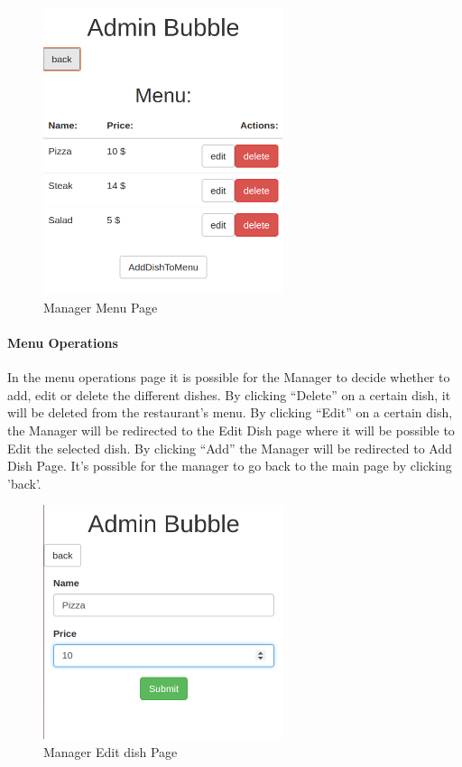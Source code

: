 \begin{figure}[H]
	\centering
	\includegraphics[width=7cm]{../../documenti/UserManualDemo/demo_screens/admin_menu.png}
	\caption{Manager Menu Page}
\end{figure}
\paragraph{Menu Operations}
In the menu operations page it is possible for the Manager to decide whether to add, edit or delete the different dishes.
By clicking ``Delete'' on a certain dish, it will be deleted from the restaurant's menu.
By clicking ``Edit'' on a certain dish, the Manager will be redirected to the Edit Dish page where it will be possible to Edit the selected dish.
By clicking ``Add'' the Manager will be redirected to Add Dish Page.
It's possible for the manager to go back to the main page by clicking 'back'.

\begin{figure}[H]
	\centering
	\includegraphics[width=7cm]{../../documenti/UserManualDemo/demo_screens/admin_edit.png}
	\caption{Manager Edit dish Page}
\end{figure}
